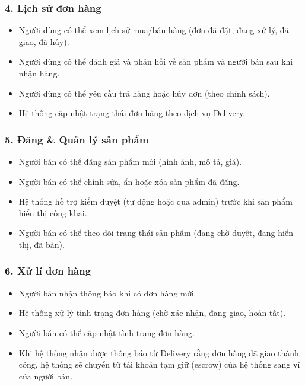 \documentclass{article}
\begin{document}
\subsubsection*{4. Lịch sử đơn hàng}
\begin{itemize}
    \item Người dùng có thể xem lịch sử mua/bán hàng (đơn đã đặt, đang xử lý, đã giao, đã hủy).
    \item Người dùng có thể đánh giá và phản hồi về sản phẩm và người bán sau khi nhận hàng.
    \item Người dùng có thể yêu cầu trả hàng hoặc hủy đơn (theo chính sách).

    \item Hệ thống cập nhật trạng thái đơn hàng theo dịch vụ Delivery.
\end{itemize}

\subsubsection*{5. Đăng \& Quản lý sản phẩm}
\begin{itemize}
    \item Người bán có thể đăng sản phẩm mới (hình ảnh, mô tả, giá).
    \item Người bán có thể chỉnh sửa, ẩn hoặc xóa sản phẩm đã đăng.
    \item Hệ thống hỗ trợ kiểm duyệt (tự động hoặc qua admin) trước khi sản phẩm hiển thị công khai.
    \item Người bán có thể theo dõi trạng thái sản phẩm (đang chờ duyệt, đang hiển thị, đã bán).
\end{itemize}

\subsubsection*{6. Xử lí đơn hàng}
\begin{itemize}

    \item Người bán nhận thông báo khi có đơn hàng mới.

    \item Hệ thống xử lý tình trạng đơn hàng (chờ xác nhận, đang giao, hoàn tất).

    \item Người bán có thể cập nhật tình trạng đơn hàng.
    
    \item Khi hệ thống nhận được thông báo từ Delivery rằng đơn hàng đã giao thành công, hệ thống sẽ chuyển từ tài khoản tạm giữ (escrow) của hệ thống sang ví của người bán.

\end{itemize}
\end{document}
